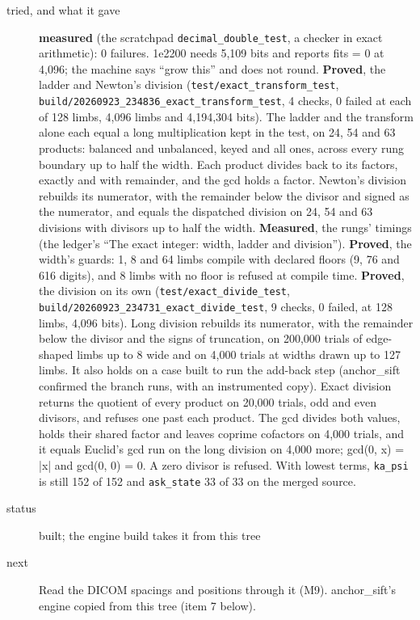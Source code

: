 \begin{description}
\item[{tried, and what it gave}] \textbf{measured} (the scratchpad \texttt{decimal\_\allowbreak{}double\_\allowbreak{}test}, a checker in exact arithmetic): 0 failures. 1e2200 needs 5,109 bits and reports fits = 0 at 4,096; the machine says “grow this” and does not round. \textbf{Proved}, the ladder and Newton's division (\texttt{test/\allowbreak{}exact\_\allowbreak{}transform\_\allowbreak{}test}, \texttt{build/\allowbreak{}20260923\_\allowbreak{}234836\_\allowbreak{}exact\_\allowbreak{}transform\_\allowbreak{}test}, 4 checks, 0 failed at each of 128 limbs, 4,096 limbs and 4,194,304 bits). The ladder and the transform alone each equal a long multiplication kept in the test, on 24, 54 and 63 products: balanced and unbalanced, keyed and all ones, across every rung boundary up to half the width. Each product divides back to its factors, exactly and with remainder, and the gcd holds a factor. Newton's division rebuilds its numerator, with the remainder below the divisor and signed as the numerator, and equals the dispatched division on 24, 54 and 63 divisions with divisors up to half the width. \textbf{Measured}, the rungs' timings (the ledger's “The exact integer: width, ladder and division”). \textbf{Proved}, the width's guards: 1, 8 and 64 limbs compile with declared floors (9, 76 and 616 digits), and 8 limbs with no floor is refused at compile time. \textbf{Proved}, the division on its own (\texttt{test/\allowbreak{}exact\_\allowbreak{}divide\_\allowbreak{}test}, \texttt{build/\allowbreak{}20260923\_\allowbreak{}234731\_\allowbreak{}exact\_\allowbreak{}divide\_\allowbreak{}test}, 9 checks, 0 failed, at 128 limbs, 4,096 bits). Long division rebuilds its numerator, with the remainder below the divisor and the signs of truncation, on 200,000 trials of edge-shaped limbs up to 8 wide and on 4,000 trials at widths drawn up to 127 limbs. It also holds on a case built to run the add-back step (anchor\_\allowbreak{}sift confirmed the branch runs, with an instrumented copy). Exact division returns the quotient of every product on 20,000 trials, odd and even divisors, and refuses one past each product. The gcd divides both values, holds their shared factor and leaves coprime cofactors on 4,000 trials, and it equals Euclid's gcd run on the long division on 4,000 more; gcd(0, x) = |x| and gcd(0, 0) = 0. A zero divisor is refused. With lowest terms, \texttt{ka\_\allowbreak{}psi} is still 152 of 152 and \texttt{ask\_\allowbreak{}state} 33 of 33 on the merged source.
\item[{status}] built; the engine build takes it from this tree
\item[{next}] Read the DICOM spacings and positions through it (M9). anchor\_\allowbreak{}sift's engine copied from this tree (item 7 below).
\end{description}

